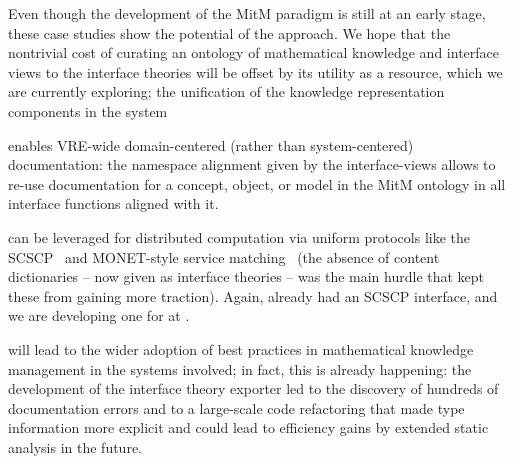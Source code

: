 Even though the development of the MitM paradigm is still at an early stage, these case
studies show the potential of the approach. We hope that the nontrivial cost of curating
an ontology of mathematical knowledge and interface views to the interface theories will
be offset by its utility as a resource, which we are currently exploring; the unification
of the knowledge representation components in the \MMT system
\begin{compactenum}
\item enables VRE-wide domain-centered (rather than system-centered) documentation: the
  namespace alignment given by the interface-views allows to re-use documentation for a
  concept, object, or model in the MitM ontology in all interface functions aligned with
  it.
\item can be leveraged for distributed computation via uniform protocols like the
  SCSCP~\cite{HorRoz:ossp09} and MONET-style service
  matching~\cite{CaprottiEtAl:MathServiceMatching04:tr} (the absence of content
  dictionaries -- now given as interface theories -- was the main hurdle that kept these
  from gaining more traction). Again, \GAP already had an SCSCP interface, and we are
  developing one for \SageMath at \cite{py-scscp:on}.
\item will lead to the wider adoption of best practices in mathematical knowledge
  management in the systems involved; in fact, this is already happening: the development
  of the \GAP interface theory exporter led to the discovery of hundreds of documentation
  errors and to a large-scale code refactoring that made type information more explicit
  and could lead to efficiency gains by extended static analysis in the future.
\end{compactenum}


